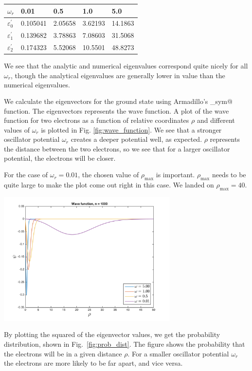 \documentclass{article}
\begin{document}
\begin{multicols}{2}
\begin{center}
\begin{tabular}{ l l l l l }\hline
	$\omega_r$ 	& 0.01		& 0.5				& 1.0		&5.0\\ \hline
	$\varepsilon_0^{'}$ 	& 0.105041	& 2.05658		& 3.62193	& 14.1863\\
	$\varepsilon_1^{'}$ 	& 0.139682	& 3.78863		& 7.08603& 31.5068 \\
	$\varepsilon_2^{'}$ 	& 0.174323	& 5.52068		& 10.5501	& 48.8273\\
	\hline
\end{tabular}
\end{center}
We see that the analytic and numerical eigenvalues correspond quite nicely for all $\omega_r$, though the analytical eigenvalues are generally lower in value than the numerical eigenvalues.

We calculate the eigenvectors for the ground state using Armadillo's \verb@eig_sym@ function. The eigenvectors represents the wave function. A plot of the wave function for two electrons as a function of relative coordinates $\rho$ and different values of $\omega_r$ is plotted in Fig. \ref{fig:wave_function}. We see that a stronger oscillator potential $\omega_r$ creates a deeper potential well, as expected. $\rho$ represents the distance between the two electrons, so we see that for a larger oscillator potential, the electrons will be closer.

For the case of $\omega_r = 0.01$, the chosen value of $\rho_{\mathrm{max}}$ is important. $\rho_{\mathrm{max}}$ needs to be quite large to make the plot come out right in this case. We landed on $\rho_{\mathrm{max}} = 40$.

\begin{center}
	\includegraphics[width=90mm]{../build-Project2-Desktop_Qt_5_5_0_clang_64bit-Debug/wave_function.png} 	
	\label{fig:wave_function}
\end{center}
By plotting the squared of the eigenvector values, we get the probability distribution, shown in Fig.~\ref{fig:prob_dist}. The figure shows the probability that the electrons will be in a given distance $\rho$.  For a smaller oscillator potential $\omega_r$ the electrons are more likely to be far apart, and vice versa.


\end{multicols}
\end{document}
